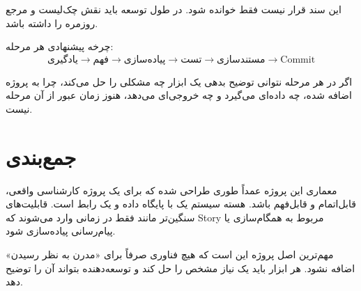 \documentclass[12pt,twoside]{book}
\begin{document}
این سند قرار نیست فقط خوانده شود. در طول توسعه باید نقش چک‌لیست و مرجع روزمره را داشته باشد.

چرخه پیشنهادی هر مرحله:
\[
\text{یادگیری} \rightarrow \text{فهم} \rightarrow \text{پیاده‌سازی} \rightarrow \text{تست} \rightarrow \text{مستندسازی} \rightarrow \text{Commit}
\]

اگر در هر مرحله نتوانی توضیح بدهی یک ابزار چه مشکلی را حل می‌کند، چرا به پروژه اضافه شده، چه داده‌ای می‌گیرد و چه خروجی‌ای می‌دهد، هنوز زمان عبور از آن مرحله نیست.

\mainmatter


























\backmatter
\chapter*{جمع‌بندی}

معماری این پروژه عمداً طوری طراحی شده که برای یک پروژه کارشناسی واقعی، قابل‌اتمام و قابل‌فهم باشد. هسته سیستم یک  با پایگاه داده  و یک رابط  است. قابلیت‌های سنگین‌تر مانند  فقط در زمانی وارد می‌شوند که Story مربوط به همگام‌سازی یا پیام‌رسانی پیاده‌سازی شود.

مهم‌ترین اصل پروژه این است که هیچ فناوری صرفاً برای «مدرن به نظر رسیدن» اضافه نشود. هر ابزار باید یک نیاز مشخص را حل کند و توسعه‌دهنده بتواند آن را توضیح دهد.
\end{document}
